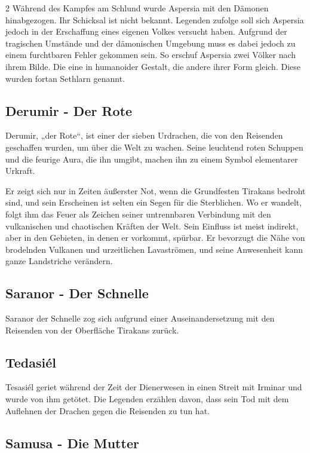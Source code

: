 \begin{multicols*}{2}
Während des Kampfes am Schlund wurde Aspersia mit den Dämonen hinabgezogen.
Ihr Schicksal ist nicht bekannt.
Legenden zufolge soll sich Aspersia jedoch in der Erschaffung eines eigenen Volkes versucht haben.
Aufgrund der tragischen Umstände und der dämonischen Umgebung muss es dabei jedoch zu einem furchtbaren Fehler gekommen sein.
So erschuf Aspersia zwei Völker nach ihrem Bilde.
Die eine in humanoider Gestalt, die andere ihrer Form gleich.
Diese wurden fortan Sethlarn genannt.

\subsection{Derumir - Der Rote}\label{subsec:derumir---der-rote}

Derumir, „der Rote“, ist einer der sieben Urdrachen, die von den Reisenden geschaffen wurden, um über die Welt zu wachen.
Seine leuchtend roten Schuppen und die feurige Aura, die ihn umgibt, machen ihn zu einem Symbol elementarer Urkraft.

Er zeigt sich nur in Zeiten äußerster Not, wenn die Grundfesten Tirakans bedroht sind, und sein Erscheinen ist selten ein Segen für die Sterblichen.
Wo er wandelt, folgt ihm das Feuer als Zeichen seiner untrennbaren Verbindung mit den vulkanischen und chaotischen Kräften der Welt.
Sein Einfluss ist meist indirekt, aber in den Gebieten, in denen er vorkommt, spürbar.
Er bevorzugt die Nähe von brodelnden Vulkanen und urzeitlichen Lavaströmen, und seine Anwesenheit kann ganze Landstriche verändern.

\subsection{Saranor - Der Schnelle}\label{subsec:saranor-der-schnelle}

Saranor der Schnelle zog sich aufgrund einer Auseinandersetzung mit den Reisenden von der Oberfläche Tirakans zurück.

\subsection{Tedasiél}\label{subsec:tedasiel}

Tesasiél geriet während der Zeit der Dienerwesen in einen Streit mit Irminar und wurde von ihm getötet.
Die Legenden erzählen davon, dass sein Tod mit dem Auflehnen der Drachen gegen die Reisenden zu tun hat.

\subsection{Samusa - Die Mutter}\label{subsec:samusa-die-mutter}


\end{multicols*}
